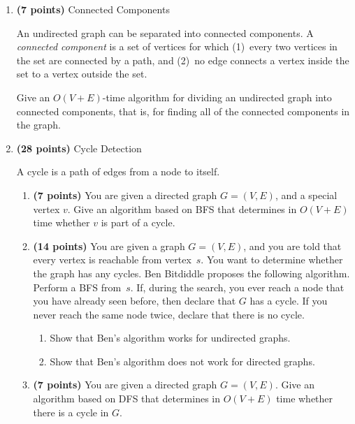 \documentclass[12pt,twoside]{article}
\begin{document}
\begin{enumerate}

\item {\bf (7 points)} Connected Components

  An undirected graph can be separated into connected components.
  A \emph{connected component} is a set of vertices for which
  (1)~every two vertices in the set are connected by a path, and
  (2)~no edge connects a vertex inside the set to a vertex outside the set.

  Give an $O(V+E)$-time algorithm for dividing an undirected graph into
  connected components, that is, for finding all of the connected components
  in the graph.

\item {\bf (28 points)} Cycle Detection

  A cycle is a path of edges from a node to itself.

  \begin{enumerate}

  \item {\bf (7 points)} You are given a directed graph $G=(V, E)$,
    and a special vertex $v$. Give an algorithm based on BFS that
    determines in $O(V+E)$ time whether $v$ is part of a cycle.
  
  \item {\bf (14 points)} You are given a graph $G=(V, E)$, and you
    are told that every vertex is reachable from vertex~$s$.
    You want to determine whether the graph has any cycles.
    Ben Bitdiddle proposes the following algorithm.
    Perform a BFS from~$s$.  If, during the search, you ever reach
    a node that you have already seen before, then declare that $G$
    has a cycle. If you never reach the same node twice, declare
    that there is no cycle.

    \begin{enumerate}

    \item Show that Ben's algorithm works for undirected graphs.
      
    \item Show that Ben's algorithm does not work for directed graphs.
      
    \end{enumerate}
  
  \item {\bf (7 points)} You are given a directed graph
    $G=(V,E)$. Give an algorithm based on DFS that determines in
    $O(V+E)$ time whether there is a cycle in $G$.
  


\end{enumerate}
\end{enumerate}
\end{document}
